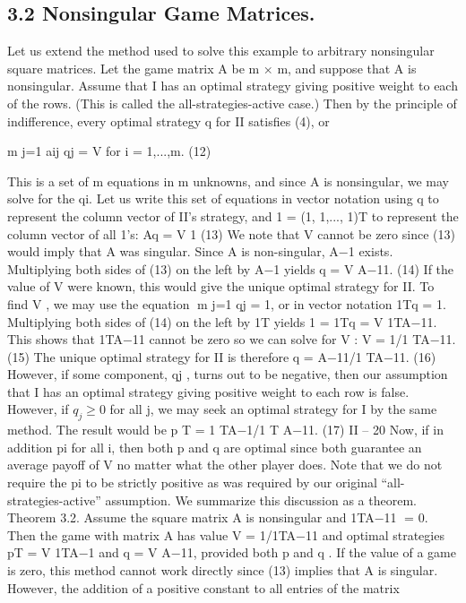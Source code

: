 \subsection{3.2 Nonsingular Game Matrices.} Let us extend the method used to solve this
example to arbitrary nonsingular square matrices. Let the game matrix A be m × m,
and suppose that A is nonsingular. Assume that I has an optimal strategy giving positive
weight to each of the rows. (This is called the all-strategies-active case.) Then by the
principle of indifference, every optimal strategy q for II satisfies (4), or

m
j=1
aij qj = V for i = 1,...,m. (12)

This is a set of m equations in m unknowns, and since A is nonsingular, we may solve
for the qi. Let us write this set of equations in vector notation using q to represent the
column vector of II’s strategy, and 1 = (1, 1,..., 1)T to represent the column vector of all
1’s:
Aq = V 1 (13)
We note that V cannot be zero since (13) would imply that A was singular. Since A is
non-singular, A−1 exists. Multiplying both sides of (13) on the left by A−1 yields
q = V A−11. (14)
If the value of V were known, this would give the unique optimal strategy for II. To find
V , we may use the equation m
j=1 qj = 1, or in vector notation 1Tq = 1. Multiplying both
sides of (14) on the left by 1T yields 1 = 1Tq = V 1TA−11. This shows that 1TA−11 cannot
be zero so we can solve for V :
V = 1/1
TA−11. (15)
The unique optimal strategy for II is therefore
q = A−11/1
TA−11. (16)
However, if some component, qj , turns out to be negative, then our assumption that I has
an optimal strategy giving positive weight to each row is false.
However, if $q_j \geq 0$ for all j, we may seek an optimal strategy for I by the same method.
The result would be
p
T = 1
TA−1/1
T
A−11. (17)
II – 20
Now, if in addition pi  for all i, then both p and q are optimal since both guarantee an
average payoff of V no matter what the other player does. Note that we do not require the
pi to be strictly positive as was required by our original “all-strategies-active” assumption.
We summarize this discussion as a theorem.
Theorem 3.2. Assume the square matrix A is nonsingular and 1TA−11 = 0. Then the
game with matrix A has value V = 1/1TA−11 and optimal strategies pT = V 1TA−1 and
q = V A−11, provided both p  and q .
If the value of a game is zero, this method cannot work directly since (13) implies
that A is singular. However, the addition of a positive constant to all entries of the matrix
